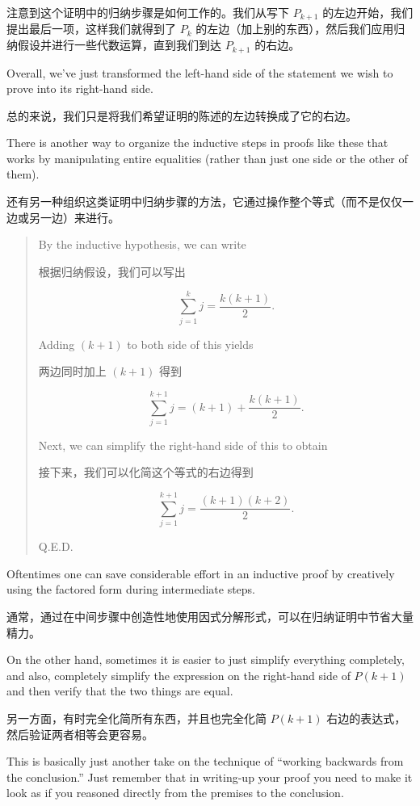 注意到这个证明中的归纳步骤是如何工作的。我们从写下 $P_{k+1}$ 的左边开始，我们提出最后一项，这样我们就得到了 $P_k$ 的左边（加上别的东西），然后我们应用归纳假设并进行一些代数运算，直到我们到达 $P_{k+1}$ 的右边。

Overall, we've just transformed the
left-hand side of the statement we wish to prove into its right-hand side.

总的来说，我们只是将我们希望证明的陈述的左边转换成了它的右边。

There is another way to organize the inductive steps in proofs like these
that works by manipulating entire equalities (rather than just one side
or the other of them).

还有另一种组织这类证明中归纳步骤的方法，它通过操作整个等式（而不是仅仅一边或另一边）来进行。
\begin{quote}

  By the inductive 
hypothesis, we can write

根据归纳假设，我们可以写出

\[ \sum_{j=1}^{k} j = \frac{k(k+1)}{2}.
\]

Adding $(k+1)$ to both side of this yields

两边同时加上 $(k+1)$ 得到

\[ \sum_{j=1}^{k+1} j = (k+1) + \frac{k(k+1)}{2}.
\]

Next, we can simplify the right-hand side of this to obtain

接下来，我们可以化简这个等式的右边得到

\[ \sum_{j=1}^{k+1} j = \frac{(k+1)(k+2)}{2}. \]

\rule{0pt}{0pt} \hspace{\fill} Q.E.D.
\end{quote}
\medskip

Oftentimes one can save considerable effort in an inductive 
proof by creatively using the factored form during intermediate steps.

通常，通过在中间步骤中创造性地使用因式分解形式，可以在归纳证明中节省大量精力。

On the other hand, sometimes it is easier to just simplify everything
completely, and also, completely simplify the expression on the 
right-hand side of $P(k+1)$ and then verify that the two things are
equal.

另一方面，有时完全化简所有东西，并且也完全化简 $P(k+1)$ 右边的表达式，然后验证两者相等会更容易。

This is basically just another take on the technique of 
``working backwards from the conclusion.''  Just remember that 
in writing-up your proof you need to make it look as if you reasoned
directly from the premises to the conclusion.

